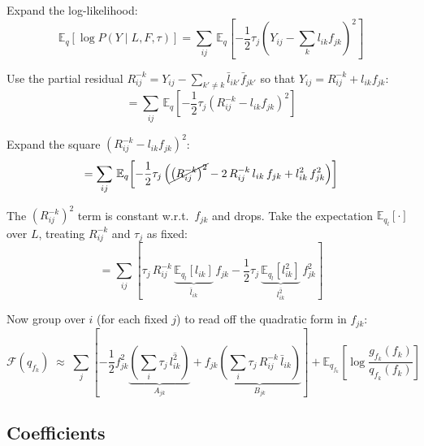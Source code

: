\documentclass[11pt]{article}
\newcommand{\lbar}[2]{\bar{l}_{#1#2}}
\newcommand{\fbar}[2]{\bar{f}_{#1#2}}
\newcommand{\lsec}[2]{\overline{l^2_{#1#2}}}
\begin{document}
\begin{derivbox}
Expand the log-likelihood:
\begin{equation}
  \mathbb{E}_{q}\!\left[\log P(Y \mid L, F, \tau)\right]
  = \sum_{ij}\,\mathbb{E}_{q}\!\left[
    -\frac{1}{2}\tau_j\left(Y_{ij} - \sum_k l_{ik}f_{jk}\right)^2
  \right] \label{eq:Fqf-lik}
\end{equation}

Use the partial residual $R^{-k}_{ij} = Y_{ij} - \sum_{k'\neq k}\lbar{i}{k'}\fbar{j}{k'}$
so that $Y_{ij} = R^{-k}_{ij} + l_{ik}f_{jk}$:
\begin{equation}
  = \sum_{ij}\,\mathbb{E}_{q}\!\left[
    -\frac{1}{2}\tau_j\left(R^{-k}_{ij} - l_{ik}f_{jk}\right)^2
  \right] \label{eq:Fqf-resid}
\end{equation}

Expand the square $(R^{-k}_{ij} - l_{ik}f_{jk})^2$:
\begin{equation}
  = \sum_{ij}\,\mathbb{E}_{q}\!\left[
    -\frac{1}{2}\tau_j\left(
      \cancel{\left(R^{-k}_{ij}\right)^2}
      - 2\,R^{-k}_{ij}\,l_{ik}\,f_{jk}
      + l_{ik}^2\,f_{jk}^2
    \right)
  \right] \label{eq:Fqf-expand}
\end{equation}

The $(R^{-k}_{ij})^2$ term is constant w.r.t.\ $f_{jk}$ and drops.  Take the
expectation $\mathbb{E}_{q_l}[\cdot]$ over $L$, treating $R^{-k}_{ij}$ and
$\tau_j$ as fixed:
\begin{equation}
  = \sum_{ij}\left[
    \tau_j\,R^{-k}_{ij}\,\underbrace{\mathbb{E}_{q_l}[l_{ik}]}_{\lbar{i}{k}}\,f_{jk}
    - \frac{1}{2}\tau_j\,\underbrace{\mathbb{E}_{q_l}[l_{ik}^2]}_{\lsec{i}{k}}\,f_{jk}^2
  \right] \label{eq:Fqf-terms}
\end{equation}

Now group over $i$ (for each fixed $j$) to read off the quadratic form in $f_{jk}$:
\begin{equation}
  \mathcal{F}(q_{f_k}) \;\approx\;
  \sum_j\left[
    -\frac{1}{2}f_{jk}^2\underbrace{\left(\sum_i \tau_j\,\lsec{i}{k}\right)}_{A_{jk}}
    + f_{jk}\underbrace{\left(\sum_i \tau_j\,R^{-k}_{ij}\,\lbar{i}{k}\right)}_{B_{jk}}
  \right]
  + \mathbb{E}_{q_{f_k}}\!\left[\log\frac{g_{f_k}(f_k)}{q_{f_k}(f_k)}\right]
  \label{eq:Fqf-final}
\end{equation}
\end{derivbox}

\subsection{Coefficients}
\end{document}

